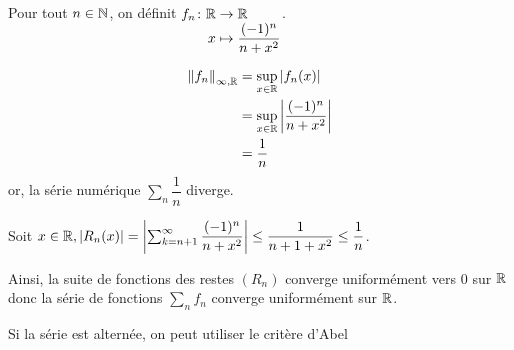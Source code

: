 \documentclass[a4paper, 12pt]{article}
\begin{document}
\begin{exemple}
    Pour tout $n \in \mathbb{N}$, on définit $\funcdef{f_n}{\R}{\R}{x}{\dfrac{(-1)^n}{n + x^2}}$.

    \begin{align*}
        \left\lVert f_n\right\rVert_{\infty, \mathbb{R}} &= \sup_{x \in \mathbb{R}}|f_n(x)| \\
        &= \sup_{x \in \mathbb{R}} \left| \dfrac{(-1)^n}{n + x^2} \right| \\
        &= \dfrac{1}{n}
    \end{align*}
    or, la série numérique $\sum_n \dfrac{1}{n}$ diverge.

    Soit $x \in \mathbb{R}, |R_n(x)| = \left| \sum_{k=n+1}^\infty \dfrac{(-1)^n}{n + x^2} \right| \leq \dfrac{1}{n + 1 + x^2} \leq \dfrac{1}{n}$.

    Ainsi, la suite de fonctions des restes $(R_n)$ converge uniformément vers $0$ sur $\mathbb{R}$ donc la série de fonctions $\sum\limits_n f_n$ converge uniformément sur $\mathbb{R}$.
\end{exemple}

\begin{methode}
    Si la série est alternée, on peut utiliser le critère d'Abel
\end{methode}
\end{document}
